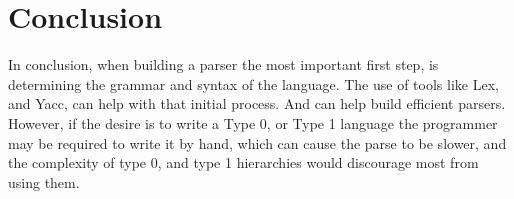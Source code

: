 \section{Conclusion}
In conclusion, when building a parser the most important first step, is determining the grammar and syntax of the language. The use of tools like Lex, and Yacc, can help with that initial process. And can help build efficient parsers. However, if the desire is to write a Type 0, or Type 1 language the programmer may be required to write it by hand, which can cause the parse to be slower, and the complexity of type 0, and type 1 hierarchies would discourage most from using them.

